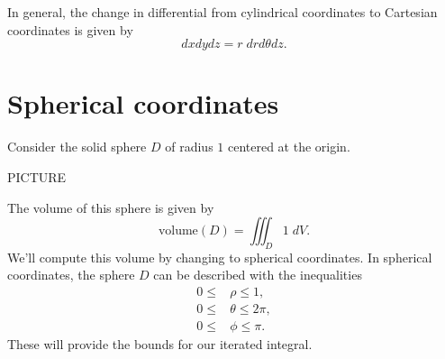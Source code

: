 \documentclass{ximera}
\begin{document}
In general, the change in differential from cylindrical coordinates to Cartesian coordinates is given by
\[
dxdydz = r\;drd\theta dz.
\]

\section*{Spherical coordinates}

\begin{example}
Consider the solid sphere $D$ of radius $1$ centered at the origin.

PICTURE

The volume of this sphere is given by
\[
\text{volume}(D) = \iiint_D 1\;dV.
\]
We'll compute this volume by changing to spherical coordinates. In spherical coordinates, the sphere $D$ can be described with the inequalities
\begin{align*}
0\leq &\rho\leq 1,\\
0\leq &\theta\leq 2\pi,\\
0\leq &\phi\leq \pi.
\end{align*}
These will provide the bounds for our iterated integral.


\end{example}
\end{document}
